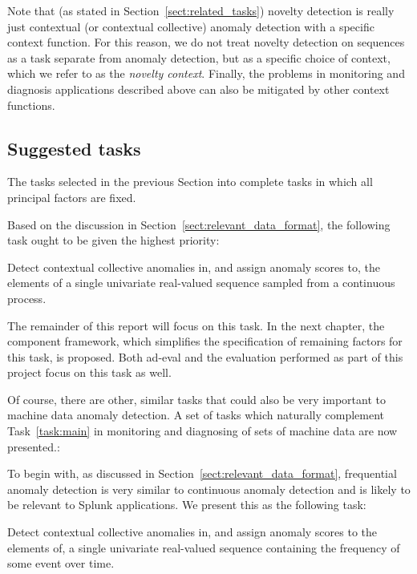 Note that (as stated in Section~\ref{sect:related_tasks}) novelty detection is really just contextual (or contextual collective) anomaly detection with a specific context function. For this reason, we do not treat novelty detection on sequences as a task separate from anomaly detection, but as a specific choice of context, which we refer to as the \emph{novelty context}. Finally, the problems in monitoring and diagnosis applications described above can also be mitigated by other context functions.

\subsection{Suggested tasks}
\label{sect:suggested_tasks}

The tasks selected in the previous Section into complete tasks in which all principal factors are fixed.

Based on the discussion in Section~\ref{sect:relevant_data_format}, the following task ought to be given the highest priority:
\begin{task}
\label{task:main}
  Detect contextual collective anomalies in, and assign anomaly scores to, the elements of a single univariate real-valued sequence sampled from a continuous process.
\end{task}

The remainder of this report will focus on this task. In the next chapter, the component framework, which simplifies the specification of remaining factors for this task, is proposed. Both ad-eval and the evaluation performed as part of this project focus on this task as well.

Of course, there are other, similar tasks that could also be very important to machine data anomaly detection. A set of tasks which naturally complement Task~\ref{task:main} in monitoring and diagnosing of sets of machine data are now presented.:

To begin with, as discussed in Section~\ref{sect:relevant_data_format}, frequential anomaly detection is very similar to continuous anomaly detection and is likely to be relevant to Splunk applications. We present this as the following task:

\begin{task}
  Detect contextual collective anomalies in, and assign anomaly scores to the elements of, a single univariate real-valued sequence containing the frequency of some event over time.
\end{task}

